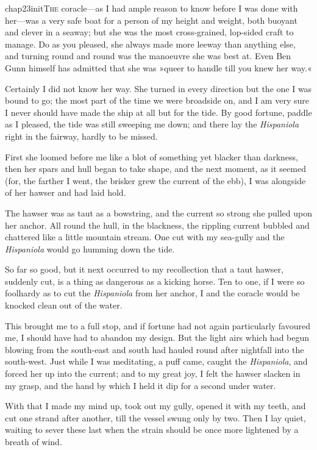 
\lettrine[lines=5,image=true,findent=2pt]{chap23initT}{he} coracle—as I had ample reason to know before I was done with her—was a very safe boat for a person of my height and weight, both buoyant and clever in a seaway; but she was the most cross-grained, lop-sided craft to manage. Do as you pleased, she always made more leeway than anything else, and turning round and round was the manoeuvre she was best at. Even Ben Gunn himself has admitted that she was »queer to handle till you knew her way.«

Certainly I did not know her way. She turned in every direction but the one I was bound to go; the most part of the time we were broadside on, and I am very sure I never should have made the ship at all but for the tide. By good fortune, paddle as I pleased, the tide was still sweeping me down; and there lay the \textit{Hispaniola} right in the fairway, hardly to be missed.

First she loomed before me like a blot of something yet blacker than darkness, then her spars and hull began to take shape, and the next moment, as it seemed (for, the farther I went, the brisker grew the current of the ebb), I was alongside of her hawser and had laid hold.

The hawser was as taut as a bowstring, and the current so strong she pulled upon her anchor. All round the hull, in the blackness, the rippling current bubbled and chattered like a little mountain stream. One cut with my sea-gully and the \textit{Hispaniola} would go humming down the tide.

So far so good, but it next occurred to my recollection that a taut hawser, suddenly cut, is a thing as dangerous as a kicking horse. Ten to one, if I were so foolhardy as to cut the \textit{Hispaniola} from her anchor, I and the coracle would be knocked clean out of the water.

This brought me to a full stop, and if fortune had not again particularly favoured me, I should have had to abandon my design. But the light airs which had begun blowing from the south-east and south had hauled round after nightfall into the south-west. Just while I was meditating, a puff came, caught the \textit{Hispaniola}, and forced her up into the current; and to my great joy, I felt the hawser slacken in my grasp, and the hand by which I held it dip for a second under water.

With that I made my mind up, took out my gully, opened it with my teeth, and cut one strand after another, till the vessel swung only by two. Then I lay quiet, waiting to sever these last when the strain should be once more lightened by a breath of wind.

